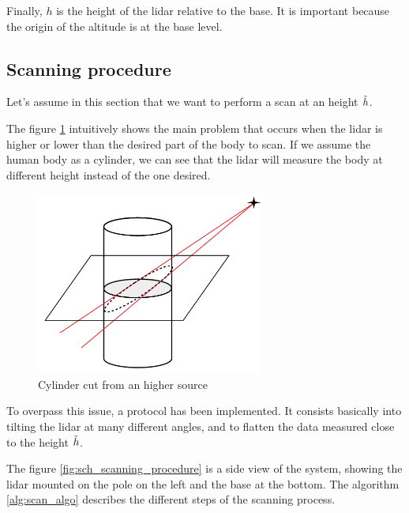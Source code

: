 \documentclass{article}
\newcommand{\vsp}{\vspace{\baselineskip}}
\begin{document}
\vsp

Finally, $h$ is the height of the lidar relative to the base. It is important because the origin of the altitude is at the base level.

\subsection{Scanning procedure}

Let's assume in this section that we want to perform a scan at an height $\Tilde{h}$. 

\vsp

The figure \ref{fig:cut_cylinder} intuitively shows the main problem that occurs when the lidar is higher or lower than the desired part of the body to scan. If we assume the human body as a cylinder, we can see that the lidar will measure the body at different height instead of the one desired.  

\begin{figure}[H]
    \centering
    \includegraphics[height=6cm]{images/cut_cylinder.png}
    \caption{Cylinder cut from an higher source}
    \label{fig:cut_cylinder}
\end{figure}

To overpass this issue, a protocol has been implemented. It consists basically into tilting the lidar at many different angles, and to flatten the data measured close to the height $\Tilde{h}$.   

\vsp

The figure \ref{fig:sch_scanning_procedure} is a side view of the system, showing the lidar mounted on the pole on the left and the base at the bottom. The algorithm \ref{alg:scan_algo} describes the different steps of the scanning process.
\end{document}
